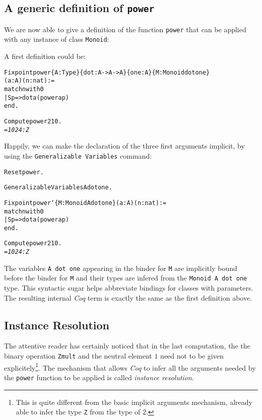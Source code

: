 \documentclass[a4]{report}
\newcommand{\coq}{\mbox{\emph{Coq}}}
\begin{document}
\subsection{A generic definition of \texttt{power}}

We are now able to give a definition of the function \texttt{power} that
can be applied with any instance of class \texttt{Monoid}:

A first definition could be:

\begin{alltt}
Fixpoint power \{A:Type\}\{dot:A->A->A\}\{one:A\}\{M: Monoid  dot one\}
               (a:A)(n:nat) :=
  match n with 0%nat => one
             | S p => dot a (power a p)
  end.

Compute power 2 10.\it\color{red}
= 1024 : Z
\end{alltt}

Happily, we can make the declaration of the three first  arguments implicit, by using the
\texttt{Generalizable Variables} command:

\begin{alltt}
Reset power.

Generalizable Variables A dot one.

Fixpoint power `\{M: Monoid A dot one\}(a:A)(n:nat) :=
  match n with 0%nat => one
             | S p => dot a (power a p)
  end.

Compute power 2 10.\it\color{red}
= 1024 : Z
\end{alltt}

The variables \texttt{A dot one} appearing in the binder for \texttt{M}
are implicitly bound before the binder for \texttt{M} and their types
are infered from the \texttt{Monoid A dot one} type. This syntactic sugar
helps abbreviate bindings for classes with parameters. The resulting
internal {\coq} term is exactly the same as the first definition above.

\subsection{Instance Resolution}

The attentive reader has certainly noticed that in the last computation, the
the binary operation \texttt{Zmult} and the neutral element $1$ need not to be
given explicitely\footnote{This is quite different from the basic implicit arguments mechanism, already able to infer the type \texttt{Z} from the type of $2$.}.
The mechanism that allows {\coq} to infer all the arguments needed by the \texttt{power} function to be applied is called \emph{instance resolution}.
\end{document}
